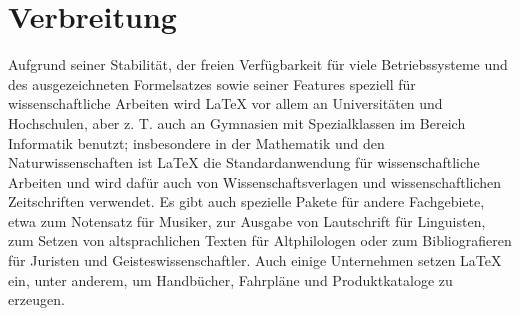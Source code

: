 
\section{Verbreitung}

Aufgrund seiner Stabilität, der freien Verfügbarkeit für viele Betriebssysteme und des ausgezeichneten Formelsatzes sowie seiner Features speziell für wissenschaftliche Arbeiten wird LaTeX vor allem an Universitäten und Hochschulen, aber z. T. auch an Gymnasien mit Spezialklassen im Bereich Informatik benutzt; insbesondere in der Mathematik und den Naturwissenschaften ist LaTeX die Standardanwendung für wissenschaftliche Arbeiten und wird dafür auch von Wissenschaftsverlagen und wissenschaftlichen Zeitschriften verwendet.\cite{TeX}\cite{Gaudeul} Es gibt auch spezielle Pakete für andere Fachgebiete, etwa zum Notensatz für Musiker, zur Ausgabe von Lautschrift für Linguisten, zum Setzen von altsprachlichen Texten für Altphilologen oder zum Bibliografieren für Juristen und Geisteswissenschaftler. Auch einige Unternehmen setzen LaTeX ein, unter anderem, um Handbücher, Fahrpläne und Produktkataloge zu erzeugen.